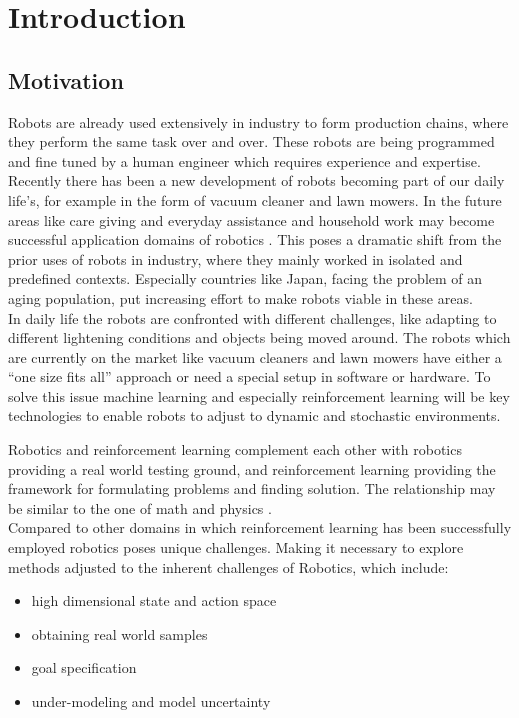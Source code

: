 
\chapter{Introduction}

\section{Motivation}
Robots are already used extensively in industry to form production chains,
where they perform the same task over and over.
These robots are being programmed and fine tuned
by a human engineer which requires experience and expertise. \\
Recently there has been a new development of robots
becoming part of our daily life's, for example in the form of 
vacuum cleaner and lawn mowers. In the future areas like care giving and
everyday assistance and household work may become successful
application domains
of robotics \citet{schaal2007new}.
This poses a dramatic shift from the prior uses of robots in industry, where
they mainly worked in isolated and predefined contexts.
Especially countries like Japan, facing the problem of an
aging population, put increasing effort to make robots
viable in these areas.  \\
In daily life the robots are confronted with different challenges,
like adapting to different lightening conditions and
objects being moved around.
The robots which are currently on the market
like vacuum cleaners and lawn mowers have
either a ``one size fits all'' approach or need a special setup
in software or hardware. To solve this issue
machine learning and especially
reinforcement learning will be key technologies to enable robots
to adjust to dynamic and stochastic environments.

Robotics and reinforcement learning complement each other
with robotics providing a real world testing ground, and reinforcement learning providing
the framework for formulating problems and finding solution. The 
relationship may be similar to the one of  math and physics
\citet{kober2013reinforcement}. \\
Compared to other domains in which reinforcement learning has been
successfully employed
robotics  poses unique challenges. Making
it necessary to explore methods adjusted to the inherent
challenges of Robotics, which include:

\begin{itemize}
\item high dimensional state and action space
\item obtaining real world samples
\item goal specification
\item under-modeling and model uncertainty
\end{itemize}


